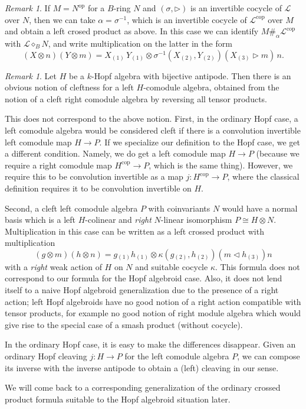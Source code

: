 \documentclass[a4paper,reqno]{amsart}
\numberwithin{equation}{section}
\theoremstyle{plain}
\theoremstyle{remark}
\newtheorem{rem}[thm]{Remark}
\numberwithin{equation}{section}
\newcommand\inv{^{-1}}
\newcommand{\ot}{\otimes}
\renewcommand{\o}{{}_{\scriptscriptstyle{(1)}}}
\renewcommand{\t}{{}_{\scriptscriptstyle{(2)}}}
\renewcommand{\th}{{}_{\scriptscriptstyle{(3)}}}
\newcommand{\la}{{\triangleright}}
\newcommand{\CL}{\mathcal{L}}
\newcommand{\op}{{\operatorname{op}}}
\newcommand\cop{{\operatorname{cop}}}
\newcommand\lcp{\#}%
\begin{document}
\begin{rem}\label{left cross product in terms of right cross product}
If $M=N^\op$ for a $B$-ring $N$ and $(\sigma,\la)$ is an invertible cocycle of $\CL$ over $N$, then we can take $\alpha=\sigma\inv$, which is an invertible cocycle of $\CL^\cop$ over $M$ and obtain a left crosed product as above. In this case we can identify $M\lcp_\alpha\CL^\cop$ with $\CL\diamond_BN$, and write multiplication on the latter in the form 
    \[(X\ot n)(Y\ot m)=X\o\,Y\o\ot \sigma^{-1}(X\t, Y\t)(X\th\la m)\, n.\]  
\end{rem}

\begin{rem}\label{first left cleft remark}
    Let $H$ be a $k$-Hopf algebra with bijective antipode. Then there is an obvious notion of cleftness for a left $H$-comodule algebra, obtained from the notion of a cleft right comodule algebra by reversing all tensor products.
    
    This does not correspond to the above notion. First, in the ordinary Hopf case, a left comodule algebra would be considered cleft if there is a convolution invertible left comodule map $H\to P$. If we specialize our definition to the Hopf case, we get a different condition. Namely, we do get a left comodule map $H\to P$ (because we require a right comodule map $H^\cop\to P$, which is the same thing). However, we require this to be convolution invertible as a map $j\colon H^\cop\to P$, where the classical definition requires it to be convolution invertible on $H$. 
    
    Second, a cleft left comodule algebra $P$ with coinvariants $N$ would have a normal basis which is a left $H$-colinear and \emph{right} $N$-linear isomorphism $P\cong H\ot N$. Multiplication in this case can be written as a left crossed product with multiplication
    \[(g\ot m)(h\ot n)=g\o h\o\ot \kappa(g\t, h\t)(m\triangleleft h\th)n\]
    with a \emph{right} weak action of $H$ on $N$ and suitable cocycle $\kappa$. This formula does not correspond to our formula for the Hopf algebroid case. Also, it does not lend itself to a naive Hopf algebroid generalization due to the presence of a right action; left Hopf algebroids have no good notion of a right action compatible with tensor products, for example no good notion of right module algebra which would give rise to the special case of a smash product (without cocycle).

    In the ordinary Hopf case, it is easy to make the differences disappear. Given an ordinary Hopf cleaving $j\colon H\to P$ for the left comodule algebra $P$, we can compose its inverse with the inverse antipode to obtain a (left) cleaving  in our sense. 
    
    We will come back to a corresponding generalization of the ordinary crossed product formula suitable to the Hopf algebroid situation later.
\end{rem}
\end{document}

